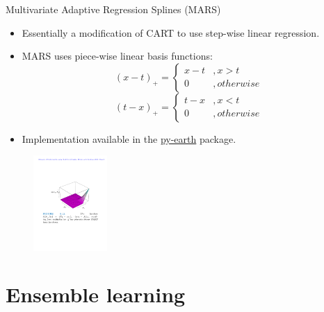 \documentclass[aspectratio=169]{beamer}
\begin{document}
\begin{frame}{Multivariate Adaptive Regression Splines (MARS)}
    \begin{itemize}
        \item Essentially a modification of CART to use step-wise linear regression.
        \item MARS uses piece-wise linear basis functions:
        \begin{equation*}
            (x - t)_+ = \left\{
  \begin{array}{lr}
    x - t &, x > t\\
    0 &, otherwise
  \end{array}
\right.
        \end{equation*}
        \begin{equation*}
            (t - x)_+ = \left\{
  \begin{array}{lr}
    t - x &, x < t\\
    0 &, otherwise
  \end{array}
\right.
        \end{equation*}
        \item Implementation available in the \href{https://contrib.scikit-learn.org/py-earth/index.html}{py-earth} package.
    \end{itemize}
    \begin{figure}
    \centering
    \includegraphics[width=0.25\textwidth]{figures/MARS.pdf}
\end{figure}
\end{frame}


\section{Ensemble learning}
\end{document}
